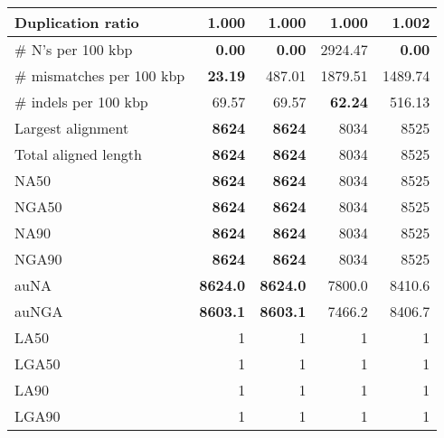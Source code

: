 \documentclass[12pt,a4paper]{article}
\begin{document}
\begin{table}[ht]
\begin{center}
\begin{tabular}{|l*{4}{|r}|}
Duplication ratio & {\bf 1.000} & {\bf 1.000} & {\bf 1.000} & 1.002 \\ \hline
\# N's per 100 kbp & {\bf 0.00} & {\bf 0.00} & 2924.47 & {\bf 0.00} \\ \hline
\# mismatches per 100 kbp & {\bf 23.19} & 487.01 & 1879.51 & 1489.74 \\ \hline
\# indels per 100 kbp & 69.57 & 69.57 & {\bf 62.24} & 516.13 \\ \hline
Largest alignment & {\bf 8624} & {\bf 8624} & 8034 & 8525 \\ \hline
Total aligned length & {\bf 8624} & {\bf 8624} & 8034 & 8525 \\ \hline
NA50 & {\bf 8624} & {\bf 8624} & 8034 & 8525 \\ \hline
NGA50 & {\bf 8624} & {\bf 8624} & 8034 & 8525 \\ \hline
NA90 & {\bf 8624} & {\bf 8624} & 8034 & 8525 \\ \hline
NGA90 & {\bf 8624} & {\bf 8624} & 8034 & 8525 \\ \hline
auNA & {\bf 8624.0} & {\bf 8624.0} & 7800.0 & 8410.6 \\ \hline
auNGA & {\bf 8603.1} & {\bf 8603.1} & 7466.2 & 8406.7 \\ \hline
LA50 & 1 & 1 & 1 & 1 \\ \hline
LGA50 & 1 & 1 & 1 & 1 \\ \hline
LA90 & 1 & 1 & 1 & 1 \\ \hline
LGA90 & 1 & 1 & 1 & 1 \\ \hline
\end{tabular}
\end{center}
\end{table}
\end{document}
